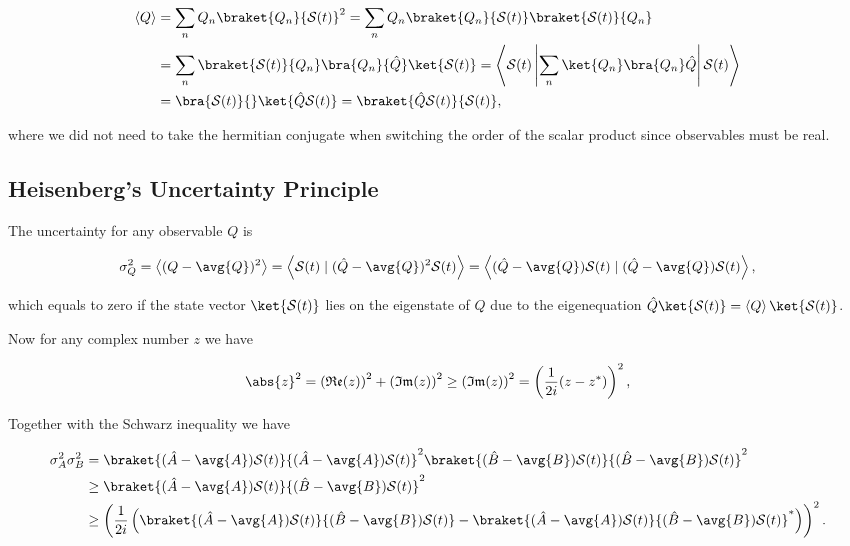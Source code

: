 \documentclass[a4paper,12pt]{report}
\begin{document}
\begin{equation}
  \begin{aligned} 
  \left \langle {Q} \right \rangle &= \sum_{n}^{} Q_{n} \braket{Q_{n} }{\mathcal{S}(t)}^2 = \sum_{n}^{} Q_{n} \braket{Q_{n} }{\mathcal{S}(t)} \braket{\mathcal{S}(t)}{Q_{n} }\\
  &= \sum_{n}^{} \braket{\mathcal{S}(t)}{Q_{n} } \bra{Q_{n} }{\hat{Q} }\ket{\mathcal{S}(t)} = \left \langle \mathcal{S}(t) \left| \sum_{n}^{} \ket{Q_{n} } \bra{Q_{n} } \hat{Q} \right| \mathcal{S}(t) \right \rangle \\
   &= \bra{\mathcal{S}(t)}{}\ket{\hat{Q} \mathcal{S}(t)} = \braket{\hat{Q} \mathcal{S}(t)}{\mathcal{S}(t)}, 
  \end{aligned}       
\end{equation}

where we did not need to take the hermitian conjugate when switching the order of the scalar product since observables must be real. 

\subsection{Heisenberg's Uncertainty Principle}

The uncertainty for any observable \(Q\) is 

\begin{equation}
  \sigma _{Q}^2 =  \left< (Q-\avg{Q} )^2 \right> = \left< \mathcal{S}(t) \mid (\hat{Q} - \avg{Q} )^2 \mathcal{S}(t) \right> = \left< (\hat{Q} - \avg{Q} )\mathcal{S}(t) \mid (\hat{Q} - \avg{Q} )\mathcal{S}(t) \right>,
\end{equation}

which equals to zero if the state vector \(\ket{\mathcal{S}(t)} \) lies on the eigenstate of \(\hat{Q} \) due to the eigenequation \(\hat{Q} \ket{\mathcal{S}(t)} = \left \langle {Q} \right \rangle \ket{\mathcal{S}(t)} \). 

Now for any complex number \(z\) we have 

\begin{equation}
  \abs{z}^2 = \left( \mathfrak{Re} (z)  \right)^2 + \left( \mathfrak{Im} (z)  \right)^2 \ge \left( \mathfrak{Im} (z)  \right)^2 = \left( \frac{1}{2i} (z - z^*)  \right)^2, \label{complex} 
\end{equation}

Together with the Schwarz inequality we have

\begin{equation}
  \begin{aligned} 
  \sigma _{A}^2 \sigma _{B}^2 &=   \braket{(\hat{A} - \avg{A} )\mathcal{S}(t)}{(\hat{A} - \avg{A} )\mathcal{S}(t)} ^2  \braket{(\hat{B} - \avg{B} )\mathcal{S}(t)}{(\hat{B} - \avg{B} )\mathcal{S}(t)} ^2 \\
  &\ge \braket{(\hat{A} - \avg{A} )\mathcal{S}(t)}{(\hat{B} - \avg{B} )\mathcal{S}(t)} ^2 \\
  &\ge \left( \frac{1}{2i} \left( \braket{(\hat{A} - \avg{A} )\mathcal{S}(t)}{(\hat{B} - \avg{B} )\mathcal{S}(t)}  - \braket{(\hat{A} - \avg{A} )\mathcal{S}(t)}{(\hat{B} - \avg{B} )\mathcal{S}(t)}^* \right)  \right)^2.
  \end{aligned} 
\end{equation}
\end{document}
